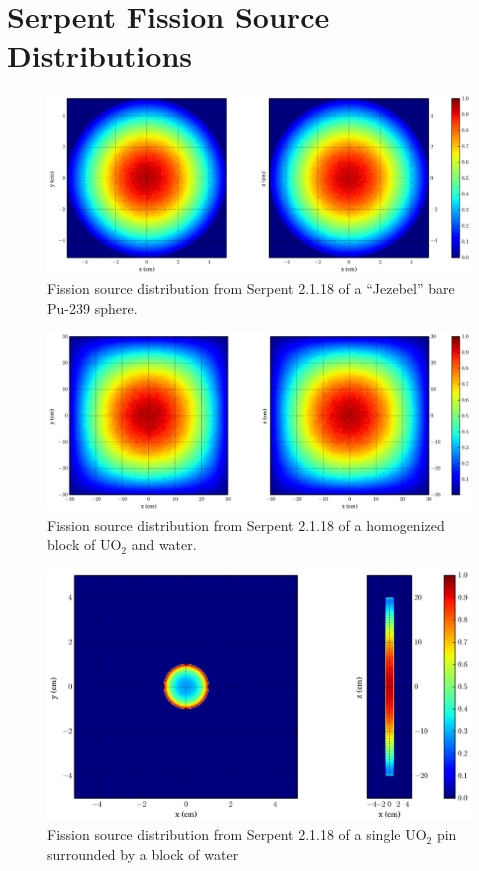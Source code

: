 \section{Serpent Fission Source Distributions}

\begin{figure}[h!] 
  \centering
    \includegraphics[width=\textwidth,trim= 4cm 0cm 6cm 0cm]{graphics/finalresults/godiva_fiss_serp-6.eps}
     \caption{Fission source distribution from Serpent 2.1.18 of a ``Jezebel'' bare Pu-239 sphere. \label{serp_godiva_mesh} }
\end{figure}

\begin{figure}[h!] 
  \centering
    \includegraphics[width=\textwidth,trim= 4cm 0cm 6cm 0cm]{graphics/finalresults/homfuel_fiss_serp-6.eps}
     \caption{Fission source distribution from Serpent 2.1.18 of a homogenized block of UO$_2$ and water. \label{serp_homfuel_mesh} }
\end{figure}

\begin{figure}[h!] 
  \centering
    \includegraphics[width=\textwidth,trim= 10cm 0cm 6cm 0cm]{graphics/finalresults/pincell_fiss_serp-6.eps}
     \caption{Fission source distribution from Serpent 2.1.18 of a single UO$_2$ pin surrounded by a block of water  \label{serp_pincell_mesh} }
\end{figure}

